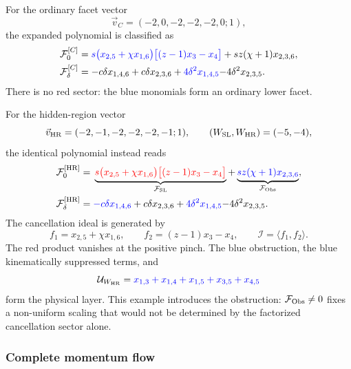 \documentclass[a4paper,11pt]{article}
\newcommand{\HR}{\mathrm{HR}}
\newcommand{\FSL}{\mathcal F_{\rm SL}}
\newcommand{\FObs}{\mathcal F_{\rm Obs}}
\newcommand{\WSL}{W_{\rm SL}}
\newcommand{\WHR}{W_{\rm HR}}
\newcommand{\vHR}{\vec v_{\rm HR}}
\newcommand{\ideal}{\mathcal I}
\newcommand{\SLcolour}[1]{{\color{red}#1}}
\newcommand{\HRcolour}[1]{{\color{blue}#1}}
\newcommand{\Othercolour}[1]{{\color{black}#1}}
\begin{document}
For the ordinary facet vector
\begin{equation}
 \vec v_C=(-2,0,-2,-2,-2,0;1),
 \label{eq:five-facet-vector}
\end{equation}
the expanded polynomial is classified as
\begin{align}
 \mathcal F_0^{[C]}={}&
 \HRcolour{s\bigl(x_{2,5}+\chi x_{1,6}\bigr)
       \bigl[(z-1)x_3-x_4\bigr]}
 +\Othercolour{sz(\chi+1)x_{2,3,6}},
 \label{eq:five-facet-F0}\\
 \mathcal F_\delta^{[C]}={}&
 \Othercolour{-c\delta x_{1,4,6}+c\delta x_{2,3,6}}
 +\HRcolour{4\delta^2x_{1,4,5}}
 \Othercolour{-4\delta^2x_{2,3,5}}.
 \label{eq:five-facet-Fdelta}
\end{align}
There is no red sector: the blue monomials form an ordinary lower facet.

For the hidden-region vector
\begin{equation}
 \vHR=(-2,-1,-2,-2,-2,-1;1),
 \qquad (\WSL,\WHR)=(-5,-4),
 \label{eq:five-HR-vector}
\end{equation}
the identical polynomial instead reads
\begin{align}
 \mathcal F_0^{[\HR]}={}&
 \underbrace{\SLcolour{s\bigl(x_{2,5}+\chi x_{1,6}\bigr)
       \bigl[(z-1)x_3-x_4\bigr]}}_{\FSL}
 +\underbrace{\HRcolour{sz(\chi+1)x_{2,3,6}}}_{\FObs},
 \label{eq:five-HR-F0}\\
 \mathcal F_\delta^{[\HR]}={}&
 \HRcolour{-c\delta x_{1,4,6}}
 +\Othercolour{c\delta x_{2,3,6}}
 +\HRcolour{4\delta^2x_{1,4,5}}
 \Othercolour{-4\delta^2x_{2,3,5}}.
 \label{eq:five-HR-Fdelta}
\end{align}
The cancellation ideal is generated by
\begin{equation}
 f_1=x_{2,5}+\chi x_{1,6},\qquad
 f_2=(z-1)x_3-x_4,\qquad \ideal=\langle f_1,f_2\rangle.
 \label{eq:five-generator}
\end{equation}
The red product vanishes at the positive pinch.  The blue obstruction,
the blue kinematically suppressed terms, and
\begin{equation}
 \mathcal U_{\WHR}
 =\HRcolour{x_{1,3}+x_{1,4}+x_{1,5}+x_{3,5}+x_{4,5}}
 \label{eq:five-U-leading}
\end{equation}
form the physical layer.  This example introduces the obstruction:
\(\FObs\ne0\) fixes a non-uniform scaling that would not be determined by
the factorized cancellation sector alone.

\subsubsection*{Complete momentum flow}
\end{document}
